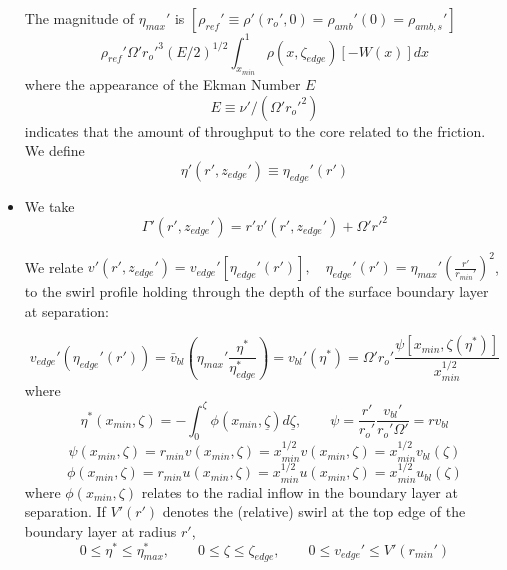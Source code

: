 \documentclass[preprint, prX]{revtex4}
\newcommand{\pfrac}[2]{\left(\frac{#1}{#2}\right)}
\newcommand{\rmin}{r_{min}}
\newcommand{\xmin}{x_{min}}
\newcommand{\zedge}{z_{edge}}
\begin{document}
\begin{itemize}
The magnitude of $\eta_{max}'$ is $[\rho_{ref}'\equiv \rho'(r_o',0)=\rho_{amb}'(0) = \rho_{amb,s}']$
\begin{equation}
\rho_{ref}'\Omega'r_o'^3 (E/2)^{1/2} \int_{\xmin}^1 \rho(x,\zeta_{edge})[-W(x)]dx
\end{equation}
where the appearance of the Ekman Number $E$
\begin{equation}
E \equiv \nu'/(\Omega'r_o'^2)
\end{equation}
indicates that the amount of throughput to the core related to the friction. We define
\begin{equation}
\eta'(r',\zedge') \equiv \eta_{edge}'(r')
\end{equation}

\item
We take
\begin{equation}
\Gamma'(r',\zedge') = r'v'(r',\zedge') + \Omega'r'^2
\end{equation}

We relate $v'(r',\zedge') = v_{edge}'[\eta_{edge}'(r')], \quad \eta_{edge}'(r') = \eta_{max}'\pfrac{r'}{\rmin'}^2$, to the swirl profile holding through the depth of the surface boundary layer at separation:

\begin{equation}
v_{edge}'(\eta_{edge}'(r')) = \bar{v}_{bl}\left( \eta_{max}'\frac{\eta^*}{\eta_{edge}^*}\right) = v_{bl}'(\eta^*) = \Omega' r_o' \frac{\psi[\xmin, \zeta(\eta^*)]}{\xmin^{1/2}}
\end{equation}
where
\begin{equation}
\eta^*(\xmin,\zeta) = -\int_0^\zeta \phi(\xmin,\underline{\zeta})d \underline{\zeta}, \qquad \psi = \frac{r'}{r_o'}\frac{v_{bl}'}{r_o' \Omega'}= r v_{bl}
\end{equation}
\begin{equation}
\psi(\xmin, \zeta) = \rmin v(\xmin,\zeta) = \xmin^{1/2} v(\xmin,\zeta) = \xmin^{1/2} v_{bl} (\zeta)
\end{equation}
\begin{equation}
\phi(\xmin,\zeta) = \rmin u(\xmin, \zeta)  = \xmin^{1/2} u(\xmin, \zeta) = \xmin^{1/2} u_{bl}(\zeta)
\end{equation}
where $\phi(\xmin, \zeta)$ relates to the radial inflow in the boundary layer at separation. If $V'(r')$ denotes the (relative) swirl at the top edge of the boundary layer at radius $r'$,
\begin{equation}
0 \leq \eta^* \leq \eta_{max}^*, \qquad 0 \leq \zeta \leq \zeta_{edge}, \qquad 0 \leq v_{edge}' \leq V'(\rmin')
\end{equation}


\end{itemize}
\end{document}
